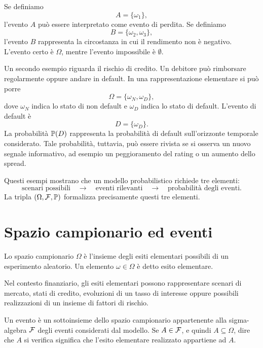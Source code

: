 Se definiamo
\[
A=\{\omega_{1}\},
\]
l'evento $A$ pu\`{o} essere interpretato come evento di perdita. Se definiamo
\[
B=\{\omega_{2},\omega_{3}\},
\]
l'evento $B$ rappresenta la circostanza in cui il rendimento non \`{e}
negativo. L'evento certo \`{e} $\Omega$, mentre l'evento impossibile \`{e}
$\emptyset$.

Un secondo esempio riguarda il rischio di credito. Un debitore pu\`{o}
rimborsare regolarmente oppure andare in default. In una rappresentazione
elementare si pu\`{o} porre
\[
\Omega=\{\omega_{N},\omega_{D}\},
\]
dove $\omega_{N}$ indica lo stato di non default e $\omega_{D}$ indica lo
stato di default. L'evento di default \`{e}
\[
D=\{\omega_{D}\}.
\]
La probabilit\`{a} $\mathbb{P}(D)$ rappresenta la probabilit\`{a} di default
sull'orizzonte temporale considerato. Tale probabilit\`{a}, tuttavia, pu\`{o}
essere rivista se si osserva un nuovo segnale informativo, ad esempio un
peggioramento del rating o un aumento dello spread.

Questi esempi mostrano che un modello probabilistico richiede tre elementi:
\[
\text{scenari possibili}\quad\longrightarrow\quad\text{eventi rilevanti}%
\quad\longrightarrow\quad\text{probabilit\`{a} degli eventi}.
\]
La tripla $(\Omega,\mathcal{F},\mathbb{P})$ formalizza precisamente questi tre elementi.

\section{Spazio campionario ed eventi}

\begin{definition}
Lo spazio campionario $\Omega$ \`{e} l'insieme degli esiti elementari
possibili di un esperimento aleatorio. Un elemento $\omega\in\Omega$ \`{e}
detto esito elementare.
\end{definition}

Nel contesto finanziario, gli esiti elementari possono rappresentare scenari
di mercato, stati di credito, evoluzioni di un tasso di interesse oppure
possibili realizzazioni di un insieme di fattori di rischio.

\begin{definition}
Un evento \`{e} un sottoinsieme dello spazio campionario appartenente alla
sigma-algebra $\mathcal{F}$ degli eventi considerati dal modello. Se
$A\in\mathcal{F}$, e quindi $A\subseteq\Omega$, dire che $A$ si verifica significa
che l'esito elementare realizzato appartiene ad $A$.
\end{definition}

